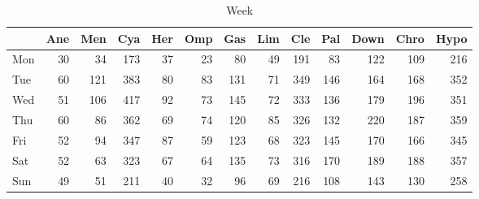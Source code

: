 \documentclass[article,nojss]{jss}\usepackage[]{graphicx}\usepackage[]{color}
\newenvironment{knitrout}{}{} %
\begin{document}
\begin{knitrout}
\color{fgcolor}\begin{table}[H]

\caption{\label{tab:weekdata}Week\label{tab:week}}
\centering
\begin{tabular}[t]{l|r|r|r|r|r|r|r|r|r|r|r|r}
\hline
  & Ane & Men & Cya & Her & Omp & Gas & Lim & Cle & Pal & Down & Chro & Hypo\\
\hline
Mon & 30 & 34 & 173 & 37 & 23 & 80 & 49 & 191 & 83 & 122 & 109 & 216\\
\hline
Tue & 60 & 121 & 383 & 80 & 83 & 131 & 71 & 349 & 146 & 164 & 168 & 352\\
\hline
Wed & 51 & 106 & 417 & 92 & 73 & 145 & 72 & 333 & 136 & 179 & 196 & 351\\
\hline
Thu & 60 & 86 & 362 & 69 & 74 & 120 & 85 & 326 & 132 & 220 & 187 & 359\\
\hline
Fri & 52 & 94 & 347 & 87 & 59 & 123 & 68 & 323 & 145 & 170 & 166 & 345\\
\hline
Sat & 52 & 63 & 323 & 67 & 64 & 135 & 73 & 316 & 170 & 189 & 188 & 357\\
\hline
Sun & 49 & 51 & 211 & 40 & 32 & 96 & 69 & 216 & 108 & 143 & 130 & 258\\
\hline
\end{tabular}
\end{table}

\end{knitrout}
\end{document}
